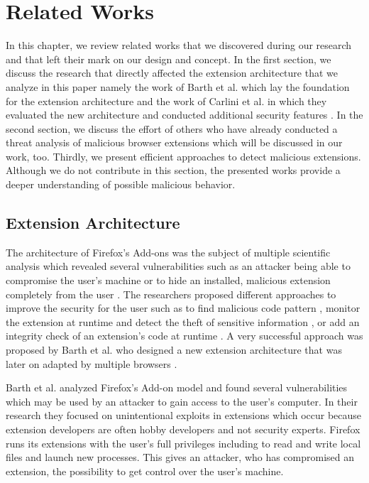 
\chapter{Related Works}
\label{chp:relatedWorks}

	In this chapter, we review related works that we discovered during our research and that left their mark on our design and concept. In the first section, we discuss the research that directly affected the extension architecture that we analyze in this paper namely the work of Barth et al. which lay the foundation for the extension architecture and the work of Carlini et al. in which they evaluated the new architecture and conducted additional security features \cite{Barth10protectingbrowsers, Carlini:2012:EGC:2362793.2362800}. In the second section, we discuss the effort of others who have already conducted a threat analysis of malicious browser extensions which will be discussed in our work, too. Thirdly, we present efficient approaches to detect malicious extensions. Although we do not contribute in this section, the presented works provide a deeper understanding of possible malicious behavior.

\section{Extension Architecture}
\label{sec:relatedWorks:extensionArchitecture}

	The architecture of Firefox's Add-ons was the subject of multiple scientific analysis which revealed several vulnerabilities such as an attacker being able to compromise the user's machine or to hide an installed, malicious extension completely from the user \cite{Bandhakavi:2011:VBE:1995376.1995398, TerLouw:2007:EWB:1420581.1420583}. The researchers proposed different approaches to improve the security for the user such as to find malicious code pattern \cite{Bandhakavi:2011:VBE:1995376.1995398}, monitor the extension at runtime and detect the theft of sensitive information \cite{Dhawan:2009:AIF:1723192.1723250, cs2015sentinel, TerLouw:2007:EWB:1420581.1420583}, or add an integrity check of an extension's code at runtime \cite{TerLouw:2007:EWB:1420581.1420583}. A very successful approach was proposed by Barth et al. who designed a new extension architecture that was later on adapted by multiple browsers \cite{Barth10protectingbrowsers}. 
	
	Barth et al. analyzed Firefox's Add-on model and found several vulnerabilities which may be used by an attacker to gain access to the user's computer. In their research they focused on unintentional exploits in extensions which occur because extension developers are often hobby developers and not security experts. Firefox runs its extensions with the user's full privileges including to read and write local files and launch new processes. This gives an attacker, who has compromised an extension, the possibility to get control over the user's machine. 
	
